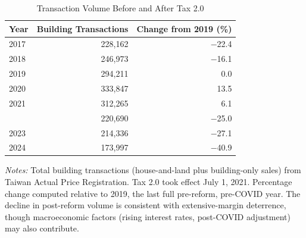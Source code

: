 \begin{table}[htbp]
\centering
\caption{Transaction Volume Before and After Tax 2.0}
\label{tab:volume}
\begin{tabular}{lrr}
\toprule
Year & Building Transactions & Change from 2019 (\%) \\
\midrule
2017 & 228,162 & $-$22.4 \\
2018 & 246,973 & $-$16.1 \\
2019 & 294,211 & 0.0 \\
2020 & 333,847 & 13.5 \\
\midrule
2021 & 312,265 & 6.1 \\
\addlinespace
2022 & 220,690 & $-$25.0 \\
2023 & 214,336 & $-$27.1 \\
2024 & 173,997 & $-$40.9 \\
\bottomrule
\end{tabular}

\vspace{0.3em}
{\footnotesize \textit{Notes:} Total building transactions (house-and-land plus building-only sales) from Taiwan Actual Price Registration. Tax 2.0 took effect July 1, 2021. Percentage change computed relative to 2019, the last full pre-reform, pre-COVID year. The decline in post-reform volume is consistent with extensive-margin deterrence, though macroeconomic factors (rising interest rates, post-COVID adjustment) may also contribute.\par}
\end{table}
